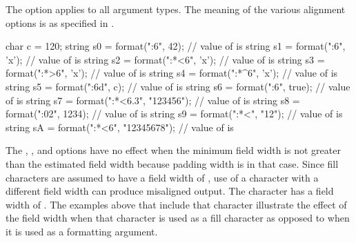\pnum
The  option applies to all argument types.
The meaning of the various alignment options is as specified in .
\begin{example}
\begin{codeblock}
char c = 120;
string s0 = format("{:6}", 42);             // value of  is 
string s1 = format("{:6}", 'x');            // value of  is 
string s2 = format("{:*<6}", 'x');          // value of  is 
string s3 = format("{:*>6}", 'x');          // value of  is 
string s4 = format("{:*^6}", 'x');          // value of  is 
string s5 = format("{:6d}", c);             // value of  is 
string s6 = format("{:6}", true);           // value of  is 
string s7 = format("{:*<6.3}", "123456");   // value of  is 
string s8 = format("{:02}", 1234);          // value of  is 
string s9 = format("{:*<}", "12");          // value of  is 
string sA = format("{:*<6}", "12345678");   // value of  is 
\end{codeblock}
\end{example}
\begin{note}
The , , and  options
have no effect when the minimum field width
is not greater than the estimated field width
because padding width is  in that case.
Since fill characters are assumed to have a field width of ,
use of a character with a different field width can produce misaligned output.
The  character has a field width of .
The examples above that include that character
illustrate the effect of the field width
when that character is used as a fill character
as opposed to when it is used as a formatting argument.
\end{note}

